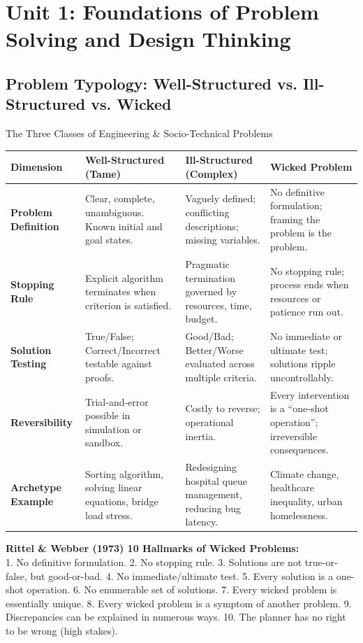\chapter{Unit 1: Foundations of Problem Solving and Design Thinking}
\label{chap:unit1-frameworks}

\section{Problem Typology: Well-Structured vs. Ill-Structured vs. Wicked}

\begin{frameworkbox}{The Three Classes of Engineering \& Socio-Technical Problems}
\begin{tabularx}{\linewidth}{|l|X|X|X|} \hline
\textbf{Dimension} & \textbf{Well-Structured (Tame)} & \textbf{Ill-Structured (Complex)} & \textbf{Wicked Problem} \\ \hline
\textbf{Problem Definition} & Clear, complete, unambiguous. Known initial and goal states. & Vaguely defined; conflicting descriptions; missing variables. & No definitive formulation; framing the problem is the problem. \\ \hline
\textbf{Stopping Rule} & Explicit algorithm terminates when criterion is satisfied. & Pragmatic termination governed by resources, time, budget. & No stopping rule; process ends when resources or patience run out. \\ \hline
\textbf{Solution Testing} & True/False; Correct/Incorrect testable against proofs. & Good/Bad; Better/Worse evaluated across multiple criteria. & No immediate or ultimate test; solutions ripple uncontrollably. \\ \hline
\textbf{Reversibility} & Trial-and-error possible in simulation or sandbox. & Costly to reverse; operational inertia. & Every intervention is a ``one-shot operation''; irreversible consequences. \\ \hline
\textbf{Archetype Example} & Sorting algorithm, solving linear equations, bridge load stress. & Redesigning hospital queue management, reducing bug latency. & Climate change, healthcare inequality, urban homelessness. \\ \hline
\end{tabularx}
\end{frameworkbox}

\begin{memorytip}
\textbf{Rittel \& Webber (1973) 10 Hallmarks of Wicked Problems:}\\
1. No definitive formulation. 2. No stopping rule. 3. Solutions are not true-or-false, but good-or-bad. 4. No immediate/ultimate test. 5. Every solution is a one-shot operation. 6. No enumerable set of solutions. 7. Every wicked problem is essentially unique. 8. Every wicked problem is a symptom of another problem. 9. Discrepancies can be explained in numerous ways. 10. The planner has no right to be wrong (high stakes).
\end{memorytip}

